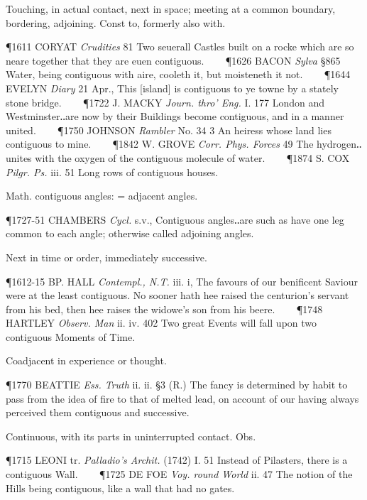 \begin{description}[wide, labelwidth=!, labelindent=0pt]

\vspace{-0.3cm}

\begin{myenumerate}

 Touching, in actual contact, next in space; meeting at a common boundary, bordering, adjoining. Const to, formerly also with.

\P 1611 CORYAT  \textit{Crudities} 81 Two seuerall Castles built on a rocke which are so neare together that they are euen contiguous.    
\P 1626 BACON  \textit{Sylva} §865 Water, being contiguous with aire, cooleth it, but moisteneth it not.    
\P 1644 EVELYN  \textit{Diary} 21 Apr., This [island] is contiguous to ye towne by a stately stone bridge.    
\P 1722 J. MACKY  \textit{Journ. thro' Eng.} I. 177 London and Westminster‥are now by their Buildings become contiguous, and in a manner united.    
\P 1750 JOHNSON  \textit{Rambler} No. 34 3 An heiress whose land lies contiguous to mine.    
\P 1842 W. GROVE  \textit{Corr. Phys. Forces} 49 The hydrogen‥unites with the oxygen of the contiguous molecule of water.    
\P 1874 S. COX  \textit{Pilgr. Ps.} iii. 51 Long rows of contiguous houses.

 Math. contiguous angles: = adjacent angles.

\P 1727-51 CHAMBERS  \textit{Cycl.} s.v., Contiguous angles‥are such as have one leg common to each angle; otherwise called adjoining angles.

 Next in time or order, immediately successive.

\P 1612-15 BP. HALL  \textit{Contempl., N.T.} iii. i, The favours of our benificent Saviour were at the least contiguous. No sooner hath hee raised the centurion's servant from his bed, then hee raises the widowe's son from his beere.    
\P 1748 HARTLEY  \textit{Observ. Man} ii. iv. 402 Two great Events will fall upon two contiguous Moments of Time.

 Coadjacent in experience or thought.

\P 1770 BEATTIE  \textit{Ess. Truth} ii. ii. §3 (R.) The fancy is determined by habit to pass from the idea of fire to that of melted lead, on account of our having always perceived them contiguous and successive.

 Continuous, with its parts in uninterrupted contact. Obs.

\P 1715 LEONI tr.  \textit{Palladio's Archit.} (1742) I. 51 Instead of Pilasters, there is a contiguous Wall.    
\P 1725 DE FOE  \textit{Voy. round World} ii. 47 The notion of the Hills being contiguous, like a wall that had no gates.


\end{myenumerate}
\end{description}
